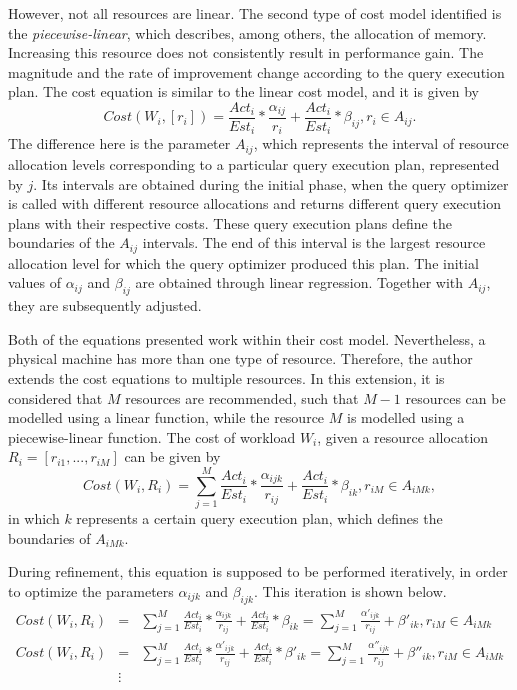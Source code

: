 However, not all resources are linear. The second type of cost model identified is the \textit{piecewise-linear}, which describes, among others, the allocation of memory. Increasing this resource does not consistently result in performance gain. The magnitude and the rate of improvement change according to the query execution plan. The cost equation is similar to the linear cost model, and it is given by
\[
  Cost(W_{i}, [r_{i}]) = \frac{Act_{i}}{Est_{i}} * \frac{\alpha_{ij}}{r_{i}} + \frac{Act_{i}}{Est_{i}} * \beta_{ij}, r_{i} \in A_{ij}.
\]
The difference here is the parameter $A_{ij}$, which represents the interval of resource allocation levels corresponding to a particular query execution plan, represented by $j$. Its intervals are obtained during the initial phase, when the query optimizer is called with different resource allocations and returns different query execution plans with their respective costs. These query execution plans define the boundaries of the $A_{ij}$ intervals. The end of this interval is the largest resource allocation level for which the query optimizer produced this plan. The initial values of $\alpha_{ij}$ and $\beta_{ij}$ are obtained through linear regression. Together with $A_{ij}$, they are subsequently adjusted.

Both of the equations presented work within their cost model. Nevertheless, a physical  machine has more than one type of resource. Therefore, the author extends the cost equations to multiple resources. In this extension, it is considered that $M$ resources are recommended, such that $M-1$ resources can be modelled using a linear function, while the resource $M$ is modelled using a piecewise-linear function. The cost of workload $W_{i}$, given a resource allocation $R_{i} = [r_{i1},...,r_{iM}]$ can be given by
\[
  Cost(W_{i}, R_{i}) = \sum_{j=1}^{M} \frac{Act_{i}}{Est_{i}} * \frac{\alpha_{ijk}}{r_{ij}} + \frac{Act_{i}}{Est_{i}} * \beta_{ik}, r_{iM} \in A_{iMk},
\]
in which $k$ represents a certain query execution plan, which defines the boundaries of $A_{iMk}$. 

During refinement, this equation is supposed to be performed iteratively, in order to optimize the parameters $\alpha_{ijk}$ and $\beta_{ijk}$. This iteration is shown below.
\begin{eqnarray*}
 Cost(W_{i}, R_{i}) &=& \sum_{j=1}^{M} \frac{Act_{i}}{Est_{i}} * \frac{\alpha_{ijk}}{r_{ij}} + \frac{Act_{i}}{Est_{i}} * \beta_{ik} = \sum_{j=1}^{M} \frac{\alpha'_{ijk}}{r_{ij}} + \beta'_{ik}, r_{iM} \in A_{iMk} \\
 Cost(W_{i}, R_{i}) &=& \sum_{j=1}^{M} \frac{Act_{i}}{Est_{i}} * \frac{\alpha'_{ijk}}{r_{ij}} + \frac{Act_{i}}{Est_{i}} * \beta'_{ik} = \sum_{j=1}^{M} \frac{\alpha''_{ijk}}{r_{ij}} + \beta''_{ik}, r_{iM} \in A_{iMk} \\
  &\vdots&
\end{eqnarray*}

